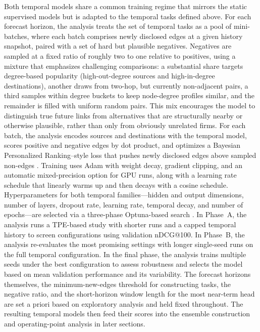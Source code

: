 Both temporal models share a common training regime that mirrors the static supervised models but is adapted to the temporal tasks defined above. For each forecast horizon, the analysis treats the set of temporal tasks as a pool of mini-batches, where each batch comprises newly disclosed edges at a given history snapshot, paired with a set of hard but plausible negatives. Negatives are sampled at a fixed ratio of roughly two to one relative to positives, using a mixture that emphasizes challenging comparisons: a substantial share targets degree-based popularity (high-out-degree sources and high-in-degree destinations), another draws from two-hop, but currently non-adjacent pairs, a third samples within degree buckets to keep node-degree profiles similar, and the remainder is filled with uniform random pairs. This mix encourages the model to distinguish true future links from alternatives that are structurally nearby or otherwise plausible, rather than only from obviously unrelated firms. For each batch, the analysis encodes sources and destinations with the temporal model, scores positive and negative edges by dot product, and optimizes a Bayesian Personalized Ranking--style loss that pushes newly disclosed edges above sampled non-edges \parencite{rendle_bpr_2009}. Training uses Adam with weight decay, gradient clipping, and an automatic mixed-precision option for GPU runs, along with a learning rate schedule that linearly warms up and then decays with a cosine schedule. Hyperparameters for both temporal families---hidden and output dimensions, number of layers, dropout rate, learning rate, temporal decay, and number of epochs---are selected via a three-phase Optuna-based search \parencite{akiba_optuna_2019}. In Phase~A, the analysis runs a TPE-based study with shorter runs and a capped temporal history to screen configurations using validation nDCG@100. In Phase~B, the analysis re-evaluates the most promising settings with longer single-seed runs on the full temporal configuration. In the final phase, the analysis trains multiple seeds under the best configuration to assess robustness and selects the model based on mean validation performance and its variability. The forecast horizons themselves, the minimum-new-edges threshold for constructing tasks, the negative ratio, and the short-horizon window length for the most near-term head are set a priori based on exploratory analysis and held fixed throughout. The resulting temporal models then feed their scores into the ensemble construction and operating-point analysis in later sections.

